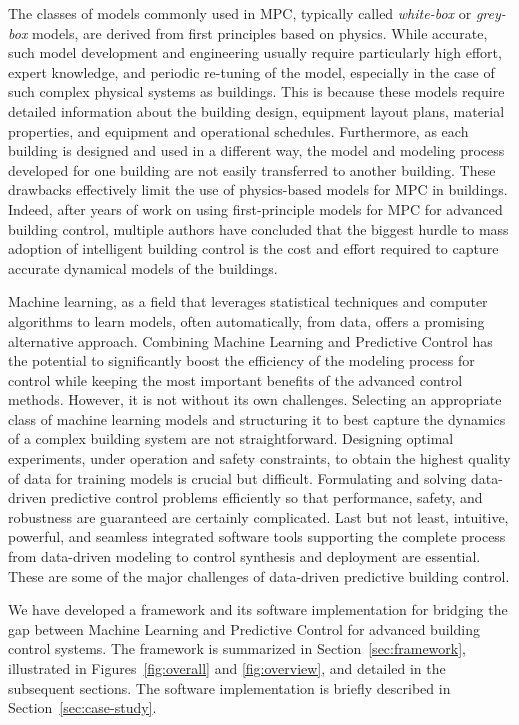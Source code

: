 The classes of models commonly used in MPC, typically called \emph{white-box} or \emph{grey-box} models, are derived from first principles based on physics. 
While accurate, %
such model development and engineering usually require particularly high effort, expert knowledge, and periodic re-tuning of the model, especially in the case of such complex physical systems as buildings.
This is because these models require detailed information about the building design, equipment layout plans, material properties, and equipment and operational schedules. 
Furthermore, as each building is designed and used in a different way, the model and modeling process developed for one building are not easily transferred to another building.
These drawbacks effectively limit the use of physics-based models for MPC in buildings.
Indeed, after years of work on using first-principle models for MPC for advanced building control, multiple authors \cite{Sturzenegger2016,vzavcekova2014}  have concluded that the biggest hurdle to mass adoption of intelligent building control is the cost and effort required to capture accurate dynamical models of the buildings.

Machine learning, as a field that leverages statistical techniques and computer algorithms to learn models, often automatically, from data, offers a promising alternative approach.
Combining Machine Learning and Predictive Control has the potential to significantly boost the efficiency of the modeling process for control while keeping the most important benefits of the advanced control methods.
However, it is not without its own challenges.
Selecting an appropriate class of machine learning models and structuring it to best capture the dynamics of a complex building system are not straightforward.
Designing optimal experiments, under operation and safety constraints, to obtain the highest quality of data for training models is crucial but difficult.
Formulating and solving data-driven predictive control problems efficiently so that performance, safety, and robustness are guaranteed are certainly complicated.
Last but not least, intuitive, powerful, and seamless integrated software tools supporting the complete process from data-driven modeling to control synthesis and deployment are essential.
These are some of the major challenges of data-driven predictive building control.

We have developed a framework and its software implementation for bridging the gap between Machine Learning and Predictive Control for advanced building control systems.
The framework is summarized in Section~\ref{sec:framework}, illustrated in Figures~\ref{fig:overall} and \ref{fig:overview}, and detailed in the subsequent sections.
The software implementation is briefly described in Section~\ref{sec:case-study}.

